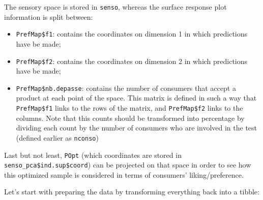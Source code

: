 \documentclass[
]{krantz}
\providecommand{\tightlist}{%
  \setlength{\itemsep}{0pt}\setlength{\parskip}{0pt}}
\begin{document}
The sensory space is stored in \texttt{senso}, whereas the surface response plot information is split between:

\begin{itemize}
\tightlist
\item
  \texttt{PrefMap\$f1}: contains the coordinates on dimension 1 in which predictions have be made;
\item
  \texttt{PrefMap\$f2}: contains the coordinates on dimension 2 in which predictions have be made;
\item
  \texttt{PrefMap\$nb.depasse}: contains the number of consumers that accept a product at each point of the space. This matrix is defined in such a way that \texttt{PrefMap\$f1} links to the rows of the matrix, and \texttt{PrefMap\$f2} links to the columns. Note that this counts should be transformed into percentage by dividing each count by the number of consumers who are involved in the test (defined earlier as \texttt{nconso})
\end{itemize}

Last but not least, \texttt{POpt} (which coordinates are stored in \texttt{senso\_pca\$ind.sup\$coord}) can be projected on that space in order to see how this optimized sample is considered in terms of consumers' liking/preference.

Let's start with preparing the data by transforming everything back into a tibble:
\end{document}
